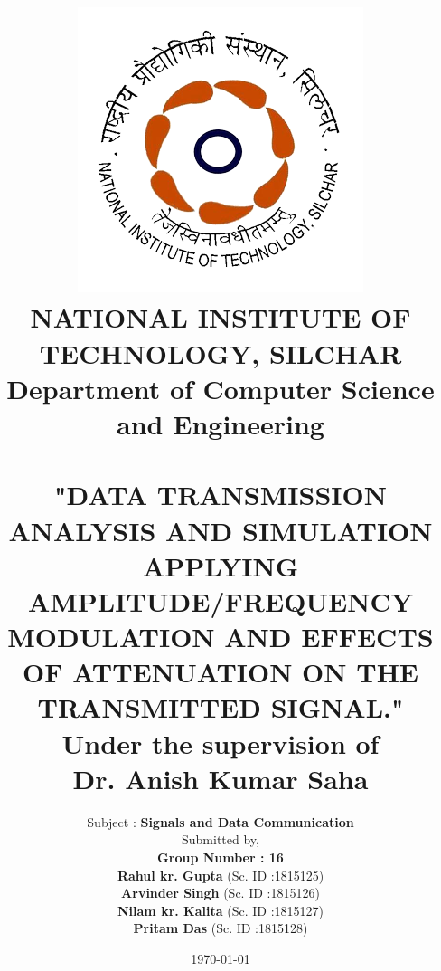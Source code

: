 \documentclass[12pt,a4paper]{article}%
\begin{document}
	
	
	\begin{titlepage}
	\title{\includegraphics[width=0.38 \textwidth]{./images/NIT_Silchar_logo.png}\\\textbf{\large NATIONAL INSTITUTE OF TECHNOLOGY, SILCHAR}\\\textbf{{\large Department of Computer Science and Engineering}}\\\\\bigskip\textbf{{\normalsize "DATA TRANSMISSION ANALYSIS AND SIMULATION APPLYING AMPLITUDE/FREQUENCY MODULATION AND EFFECTS OF ATTENUATION ON THE TRANSMITTED SIGNAL." }}\\\bigskip \small{Under the supervision of}\\ \large\textbf{Dr. Anish Kumar Saha}}
	\author{Subject : \textbf{Signals and Data Communication} \\
		 Submitted by,\\ \textbf{Group Number : 16}\\ \textbf{Rahul kr. Gupta} (Sc. ID :1815125)\\ \textbf{Arvinder Singh}  (Sc. ID :1815126)\\ \textbf{Nilam kr. Kalita} (Sc. ID :1815127)\\ \textbf{Pritam Das} (Sc. ID :1815128)\\ }
	\date{\today}
	\clearpage\maketitle
	\thispagestyle{empty}
	\end{titlepage}
	
\end{document}
